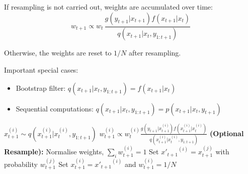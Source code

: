 \documentclass[12pt]{article}
\begin{document}
If resampling is not carried out, weights are accumulated over time:
$$w_{t+1} \propto w_t\, \frac{g(y_{t+1} | x_{t+1}) f(x_{t+1} | x_t)}{q(x_{t+1} | x_t, y_{1:t+1})}$$

Otherwise, the weights are reset to $1/N$ after resampling.

Important special cases:
\begin{itemize}
\item Bootstrap filter: $q(x_{t+1} | x_t, y_{1:t+1}) = f(x_{t+1} | x_t)$
\item Sequential computations: $q(x_{t+1} | x_t, y_{1:t+1}) = p(x_{t+1} | x_t, y_{t+1})$
\end{itemize}

\begin{algorithm}
\caption{General Particle Filter}
\begin{algorithmic}
        \State $x_{t+1}^{(i)} \sim q(x_{t+1}^{(i)} | x_t^{(i)}, y_{1:t+1})$
        \State $w_{t+1}^{(i)} \propto w_t^{(i)} \frac{g(y_{t+1} | x_{t+1}^{(i)}) f(x_{t+1}^{(i)} | x_t^{(i)})}{q(x_{t+1}^{(i)} | x_t^{(i)}, y_{1:t+1})}$
    \EndFor
    \State \textbf{(Optional Resample):}
    \State Normalise weights, $\sum_i w_{t+1}^{(i)} = 1$
        \State Set ${x'_{t+1}}^{(i)} = x_{t+1}^{(j)}$ with probability $w_{t+1}^{(j)}$
    \EndFor
        \State Set $x_{t+1}^{(i)} = {x'_{t+1}}^{(i)}$ and $w_{t+1}^{(i)} = 1/N$
    \EndFor
\EndFor
\end{algorithmic}
\end{algorithm}
\end{document}

